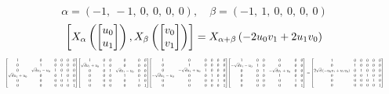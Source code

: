 \documentclass[11pt]{article}
\theoremstyle{definition}
\begin{document}
\[
\alpha = \left( -1, \  -1, \  0, \  0, \  0, \  0\right), \quad \beta = \left( -1, \  1, \  0, \  0, \  0, \  0\right)
\]
\[
\scaletoalign{\textwidth}{\left[ X_{\alpha}\left(\left[\begin{matrix}u_{0}\\u_{1}\end{matrix}\right]\right), X_{\beta}\left(\left[\begin{matrix}v_{0}\\v_{1}\end{matrix}\right]\right) \right] = X_{\alpha + \beta}\left(- 2 u_{0} v_{1} + 2 u_{1} v_{0}\right)}
\]
\[
\scaletoalign{\textwidth}{{\left[\begin{matrix}1 & 0 & 0 & 0 & 0 & 0\\0 & 1 & 0 & 0 & 0 & 0\\0 & \sqrt{d} u_{1} - u_{0} & 1 & 0 & 0 & 0\\\sqrt{d} u_{1} + u_{0} & 0 & 0 & 1 & 0 & 0\\0 & 0 & 0 & 0 & 1 & 0\\0 & 0 & 0 & 0 & 0 & 1\end{matrix}\right]} {\left[\begin{matrix}1 & 0 & 0 & 0 & 0 & 0\\\sqrt{d} v_{1} + v_{0} & 1 & 0 & 0 & 0 & 0\\0 & 0 & 1 & \sqrt{d} v_{1} - v_{0} & 0 & 0\\0 & 0 & 0 & 1 & 0 & 0\\0 & 0 & 0 & 0 & 1 & 0\\0 & 0 & 0 & 0 & 0 & 1\end{matrix}\right]} {\left[\begin{matrix}1 & 0 & 0 & 0 & 0 & 0\\0 & 1 & 0 & 0 & 0 & 0\\0 & - \sqrt{d} u_{1} + u_{0} & 1 & 0 & 0 & 0\\- \sqrt{d} u_{1} - u_{0} & 0 & 0 & 1 & 0 & 0\\0 & 0 & 0 & 0 & 1 & 0\\0 & 0 & 0 & 0 & 0 & 1\end{matrix}\right]} {\left[\begin{matrix}1 & 0 & 0 & 0 & 0 & 0\\- \sqrt{d} v_{1} - v_{0} & 1 & 0 & 0 & 0 & 0\\0 & 0 & 1 & - \sqrt{d} v_{1} + v_{0} & 0 & 0\\0 & 0 & 0 & 1 & 0 & 0\\0 & 0 & 0 & 0 & 1 & 0\\0 & 0 & 0 & 0 & 0 & 1\end{matrix}\right]} = {\left[\begin{matrix}1 & 0 & 0 & 0 & 0 & 0\\0 & 1 & 0 & 0 & 0 & 0\\2 \sqrt{d} \left(- u_{0} v_{1} + u_{1} v_{0}\right) & 0 & 1 & 0 & 0 & 0\\0 & 0 & 0 & 1 & 0 & 0\\0 & 0 & 0 & 0 & 1 & 0\\0 & 0 & 0 & 0 & 0 & 1\end{matrix}\right]}}
\]
\end{document}
